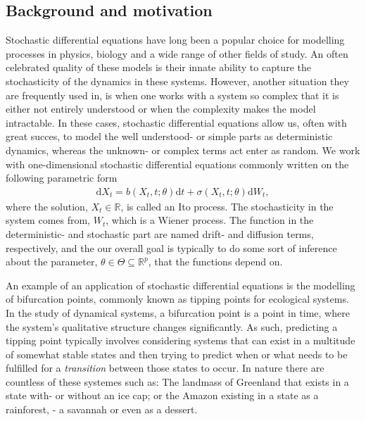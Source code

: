 \subsection{Background and motivation}
Stochastic differential equations have long been a popular choice for modelling processes in physics, biology and a wide range of other fields of study. An often celebrated quality of these models is their innate ability to capture the stochasticity of the dynamics in these systems. However, another situation they are frequently used in, is when one works with a system so complex that it is either not entirely understood or when the complexity makes the model intractable. In these cases, stochastic differential equations allow us, often with great succes, to model the well understood- or simple parts as deterministic dynamics, whereas the unknown- or complex terms act enter as random. We work with one-dimensional stochastic differential equations commonly written on the following parametric form
\begin{align}
    \mathrm{d}X_t = b(X_t, t;\theta)\mathrm{d}t + \sigma\left(X_t, t; \theta\right)\mathrm{d}W_t,
\end{align}
where the solution, $X_t\in\mathbb{R}$, is called an Ito process. The stochasticity in the system comes from, $W_t$, which is a Wiener process. The function in the deterministic- and stochastic part are named drift- and diffusion terms, respectively, and the our overall goal is typically to do some sort of inference about the parameter, $\theta\in\Theta\subseteq\mathbb{R}^p$, that the functions depend on. 

An example of an application of stochastic differential equations is the modelling of bifurcation points, commonly known as tipping points for ecological systems. In the study of dynamical systems, a bifurcation point is a point in time, where the system's qualitative structure changes significantly. As such, predicting a tipping point typically involves considering systems that can exist in a multitude of somewhat stable states and then trying to predict when or what needs to be fulfilled for a \textit{transition} between those states to occur. In nature there are countless of these systemes such as: The landmass of Greenland that exists in a state with- or without an ice cap; or the Amazon existing in a state as a rainforest, - a savannah or even as a dessert.

